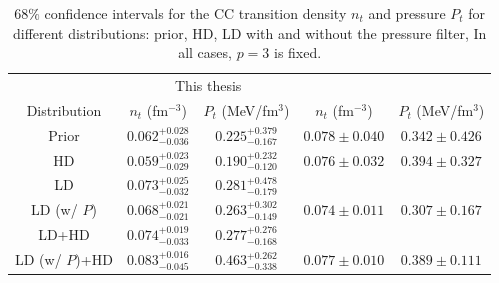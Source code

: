\begin{table}[!t]
\begin{center}
\begin{tabular}{ccccc} 
  \toprule
  \toprule
  & \multicolumn{2}{c}{This thesis} & 
  \multicolumn{2}{c}{\cite{Carreau2019cc}}\\
  Distribution & $n_t$ (fm$^{-3}$) & $P_t$ (MeV/fm$^3$) & $n_t$
  (fm$^{-3}$) & $P_t$ (MeV/fm$^3$)\\
  \midrule
  Prior & $0.062_{-0.036}^{+0.028}$ & $0.225_{-0.167}^{+0.379}$ & $0.078\pm
  0.040$ & $0.342\pm 0.426$\\
  HD & $0.059_{-0.029}^{+0.023}$ & $0.190_{-0.120}^{+0.232}$ & $0.076\pm 0.032$
     & $0.394\pm 0.327$\\ 
  LD & $0.073_{-0.032}^{+0.025}$ & $0.281_{-0.179}^{+0.478}$ & &\\ 
  LD (w/ $P$) & $0.068_{-0.021}^{+0.021}$ & $0.263_{-0.149}^{+0.302}$ & $0.074
  \pm 0.011$ & $0.307\pm 0.167$\\ 
  LD+HD & $0.074_{-0.033}^{+0.019}$ & 
  $0.277_{-0.168}^{+0.276}$\\ 
  LD (w/ $P$)+HD & $0.083_{-0.045}^{+0.016}$ & $0.463_{-0.338}^{+0.262}$ & 
  $0.077\pm 0.010$ & $0.389\pm 0.111$\\ 
  \bottomrule
  \bottomrule
\end{tabular}
\end{center}
\caption[$68\%$ confidence intervals for the crust-core transition density and
pressure for different filters]{$68\%$ confidence intervals for the CC
transition density $n_t$ and pressure $P_t$ for different distributions: prior, 
HD, LD with and without the pressure filter,  In all cases, $p=3$ is fixed. }\label{table:ntpt}
\end{table}

